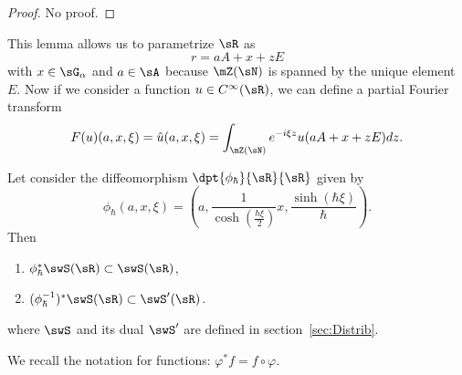 \begin{proof}
No proof.
\end{proof}

This lemma allows us to parametrize $\sR$ as
\[
  r=aA+x+zE
\]
with $x\in\sG_{\alpha}$ and $a\in \sA$ because $\mZ(\sN)$ is spanned by the unique element $E$. Now if we consider a function $u\in C^{\infty}(\sR)$, we can define a partial Fourier transform
\[
  F(u)(a,x,\xi)=\hat u(a,x,\xi)=\int_{\mZ(\sN)}e^{-i\xi z}u(aA+x+zE)dz.
\]

\begin{theorem}
Let consider the diffeomorphism $\dpt{\phi_{\hbar}}{\sR}{\sR}$ given by
\[
   \phi_{\hbar}(a,x,\xi)=\left( a,\frac{1}{\cosh(\frac{\hbar\xi}{2})}x,\frac{\sinh(\hbar\xi)}{\hbar} \right).
\]
Then

\begin{enumerate}
\item $\phi_{\hbar}^*\swS(\sR)\subset\swS(\sR)$,
\item $(\phi^{-1}_{\hbar})^*\swS(\sR)\subset\swS'(\sR)$.
\end{enumerate}
where $\swS$ and its dual $\swS'$ are defined in section~\ref{sec:Distrib}.

\end{theorem}

We recall the notation for functions: $\varphi^*f=f\circ\varphi$.

